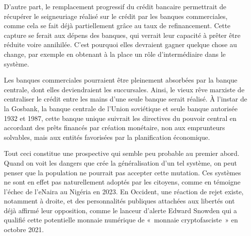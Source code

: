 D'autre part, le remplacement progressif du crédit bancaire permettrait de récupérer le seigneuriage réalisé sur le crédit par les banques commerciales, comme cela se fait déjà partiellement grâce au taux de refinancement. Cette capture se ferait aux dépens des banques, qui verrait leur capacité à prêter être réduite voire annihilée. C'est pourquoi elles devraient gagner quelque chose au change, par exemple en obtenant à la place un rôle d'intermédiaire dans le système.

Les banques commerciales pourraient être pleinement absorbées par la banque centrale, dont elles deviendraient les succursales. Ainsi, le vieux rêve marxiste de centraliser le crédit entre les mains d'une seule banque serait réalisé. À l'instar de la Gosbank, la banque centrale de l'Union soviétique et seule banque autorisée 1932 et 1987, cette banque unique suivrait les directives du pouvoir central en accordant des prêts financés par création monétaire, non aux emprunteurs solvables, mais aux entités favorisées par la planification économique.


Tout ceci constitue une prospective qui semble peu probable au premier abord. Quand on voit les dangers que crée la généralisation d'un tel système, on peut penser que la population ne pourrait pas accepter cette mutation. Ces systèmes ne sont en effet pas naturellement adoptés par les citoyens, comme en témoigne l'échec de l'eNaira au Nigéria en 2023. En Occident, une réaction de rejet existe, notamment à droite, et des personnalités publiques attachées aux libertés ont déjà affirmé leur opposition, comme le lanceur d'alerte Edward Snowden qui a qualifié cette potentielle monnaie numérique de «~monnaie cryptofasciste~» en octobre 2021.

